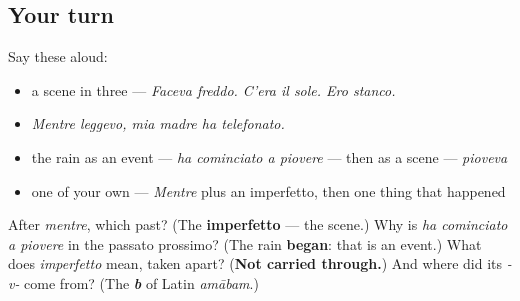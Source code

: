 \subsection*{Your turn}
Say these aloud:

\begin{itemize}
\raggedright
  \item a scene in three — \emph{Faceva freddo. C'era il sole. Ero stanco.}
  \item \emph{Mentre leggevo, mia madre ha telefonato.}
  \item the rain as an event — \emph{ha cominciato a piovere} — then as a scene — \emph{pioveva}
  \item one of your own — \emph{Mentre} plus an imperfetto, then one thing that happened
\end{itemize}

\begin{tcolorbox}[breakable,colback=teal!4,colframe=teal!35!black,title={Before you move on}]
After \emph{mentre}, which past? (The \textbf{imperfetto} — the scene.) Why is \emph{ha cominciato a piovere} in the passato prossimo? (The rain \textbf{began}: that is an event.) What does \emph{imperfetto} mean, taken apart? (\textbf{Not carried through.}) And where did its \emph{-v-} come from? (The \emph{\textbf{b}} of Latin \emph{amābam}.)
\end{tcolorbox}

